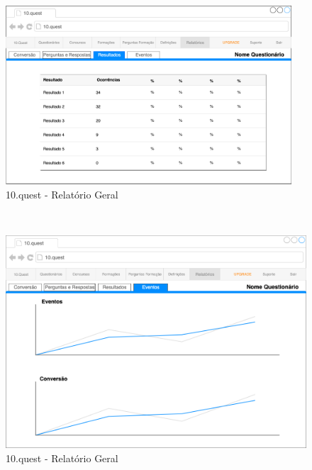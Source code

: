 \begin{figure}[ht!]
	\begin{center}
		\includegraphics[width=0.95\textwidth]{img/prototipos/r3.png}
		\caption{10.quest - Relatório Geral}
		\label{10q-r3}
	\end{center}
\end{figure}
\mbox{ }
\begin{figure}[ht!]
	\begin{center}
		\includegraphics[width=1\textwidth]{img/prototipos/r4.png}
		\caption{10.quest - Relatório Geral}
		\label{10q-r4}
	\end{center}
\end{figure}


